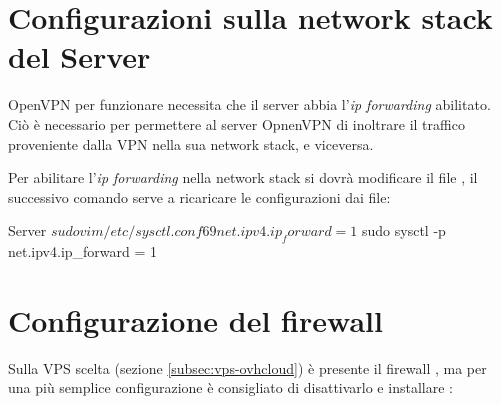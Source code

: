 \section{Configurazioni sulla network stack del Server \ok}
\label{sec:network_stack}

OpenVPN per funzionare necessita che il server abbia l'\textit{ip forwarding} abilitato. Ciò è necessario per permettere al server OpnenVPN di inoltrare il traffico proveniente dalla VPN nella sua network stack, e viceversa.

Per abilitare l'\textit{ip forwarding} nella network stack si dovrà modificare il file , il successivo comando serve a ricaricare le configurazioni dai file:

\begin{bashcode}{Server}{}
$ sudo vim /etc/sysctl.conf
69 net.ipv4.ip_forward = 1
$ sudo sysctl -p
net.ipv4.ip_forward = 1
\end{bashcode}

\section{Configurazione del firewall \ok}
\label{sec:firewall}

Sulla VPS scelta (sezione \ref{subsec:vps-ovhcloud}) è presente il firewall , ma per una più semplice configurazione è consigliato di disattivarlo e installare :


